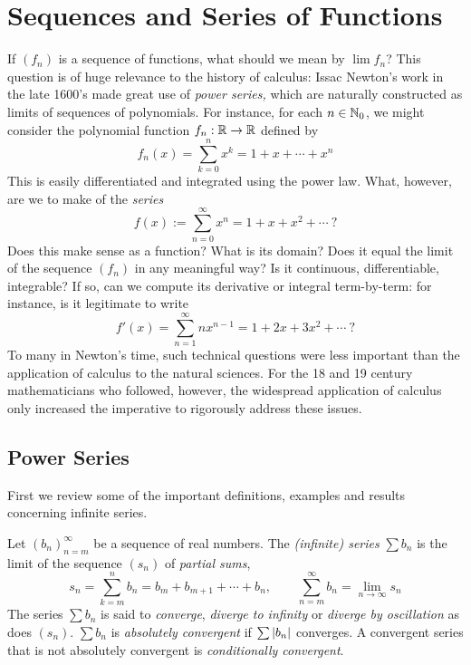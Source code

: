 \graphicspath{{2series/asy/}}

\section{Sequences and Series of Functions}\label{chap:series}

If $(f_n)$ is a sequence of functions, what should we mean by $\lim f_n$? This question is of huge relevance to the history of calculus: Issac Newton's work in the late 1600's made great use of \emph{power series,} which are naturally constructed as limits of sequences of polynomials.\medbreak
For instance, for each $n\in\mathbb{N}_0$, we might consider the polynomial function $f_n:\mathbb{R}\to\mathbb{R}$ defined by
\[
	f_n(x)=\sum_{k=0}^nx^k=1+x+\cdots+x^n
\]
This is easily differentiated and integrated using the power law. What, however, are we to make of the \emph{series}
\[
	f(x):=\sum_{n=0}^\infty x^n=1+x+x^2+\cdots\ \text{?}
\]
Does this make sense as a function? What is its domain? Does it equal the limit of the sequence $(f_n)$ in any meaningful way? Is it continuous, differentiable, integrable? If so, can we compute its derivative or integral term-by-term: for instance, is it legitimate to write
\[
	f'(x)=\sum_{n=1}^\infty nx^{n-1}=1+2x+3x^2+\cdots\ \text{?}
\]
To many in Newton's time, such technical questions were less important than the application of calculus to the natural sciences. For the 18\th{} and 19\th{} century mathematicians who followed, however, the widespread application of calculus only increased the imperative to rigorously address these issues. 


\setcounter{subsection}{22}
\subsection{Power Series}

First we review some of the important definitions, examples and results concerning infinite series.

\begin{defn}{}{}
	Let $(b_n)_{n=m}^\infty$ be a sequence of real numbers. The \emph{(infinite) series} $\sum b_n$ is the limit of the sequence $(s_n)$ of \emph{partial sums},
	\[
		s_n=\sum_{k=m}^nb_n=b_m+b_{m+1}+\cdots+b_n,\qquad 
		\sum_{n=m}^\infty b_n=\lim_{n\to\infty}s_n
	\]
	The series $\sum b_n$ is said to \emph{converge}, \emph{diverge to infinity} or \emph{diverge by oscillation\footnotemark} as does $(s_n)$.\smallbreak
	$\sum b_n$ is \emph{absolutely convergent} if $\sum\left| b_n\right|$ converges. A convergent series that is not absolutely convergent is \emph{conditionally convergent}.
\end{defn}

